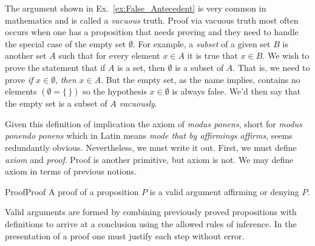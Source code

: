         \begin{example}
            \label{ex:Vacuous_Truth}%
            The argument shown in Ex.~\ref{ex:False_Antecedent} is very common
            in mathematics and is called a \textit{vacuous} truth.%
             Proof via vacuous truth
            most often occurs when one has a proposition that needs proving and
            they need to handle the special case of the empty set $\emptyset$.
            For example, a \textit{subset} of a given set $B$ is another set $A$
            such that for every element $x\in{A}$ it is true that $x\in{B}$. We
            wish to prove the statement that if $A$ is a set, then $\emptyset$
            is a subset of $A$. That is, we need to prove
            \textit{if} $x\in\emptyset$, \textit{then} $x\in{A}$. But the empty
            set, as the name implies, contains no elements $(\emptyset=\{\,\})$
            so the hypothesis $x\in\emptyset$ is always false. We'd then say
            that the empty set is a subset of $A$ \textit{vacuously}.
        \end{example}
        Given this definition of implication the axiom of \textit{modus ponens},
        short for \textit{modus ponendo ponens} which in Latin means
        \textit{mode that by affirmings affirms}, seems redundantly obvious.
        Nevertheless, we must write it out. First, we must define
        \textit{axiom} and \textit{proof}. Proof is another primitive, but axiom
        is not. We may define axiom in terms of previous notions.
        \begin{fdefinition}{Proof}{Proof}
            A \gls{proof} of a \gls{proposition} $P$ is a valid argument
            affirming or denying $P$.
        \end{fdefinition}
        Valid arguments are formed by combining previously proved propositions
        with definitions to arrive at a conclusion using the allowed rules of
        inference. In the presentation of a proof one must justify each step
        without error.
